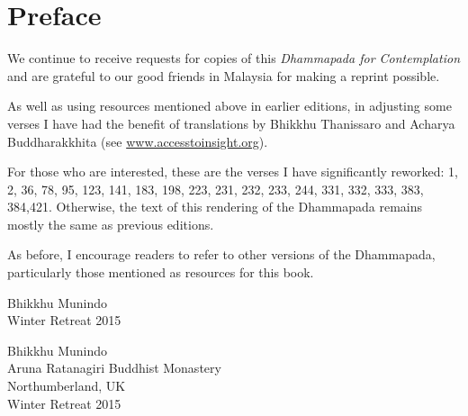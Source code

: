 
\chapter[Preface to the fourth edition (2015)]{Preface}

We continue to receive requests for copies of this \emph{Dhammapada for
Contemplation} and are grateful to our good friends in Malaysia for making a
reprint possible.

As well as using resources mentioned above in earlier editions, in adjusting
some verses I have had the benefit of translations by Bhikkhu Thanissaro and
Acharya Buddharakkhita (see
\href{http://accesstoinsight.org}{www.accesstoinsight.org}).

For those who are interested, these are the verses I have significantly
reworked: 1, 2, 36, 78, 95, 123, 141, 183, 198, 223, 231, 232, 233, 244, 331,
332, 333, 383, 384,421. Otherwise, the text of this rendering of the Dhammapada
remains mostly the same as previous editions.

As before, I encourage readers to refer to other versions of the Dhammapada,
particularly those mentioned as resources for this book.

\ifpocketversion

\enlargethispage{\baselineskip}

{\raggedleft
Bhikkhu Munindo\\
Winter Retreat 2015
\par}

\else

{\raggedleft
Bhikkhu Munindo\\
Aruna Ratanagiri Buddhist Monastery\\
Northumberland, UK\\
Winter Retreat 2015
\par}

\fi
